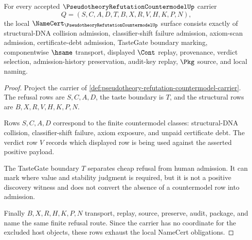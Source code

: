 \begin{theorem}
\label{thm:pseudotheory-refutation-countermodel-namecert-obligations}
For every accepted $\PseudotheoryRefutationCountermodelUp$ carrier
$$
Q=(S,C,A,D,T,B,X,R,V,H,K,P,N),
$$
the local $\NameCert_{\PseudotheoryRefutationCountermodelUp}$ surface consists
exactly of structural-DNA collision admission, classifier-shift failure
admission, axiom-scan admission, certificate-debt admission, TasteGate
boundary marking, componentwise $\hsame$ transport, displayed $\Cont$ replay,
provenance, verdict selection, admission-history preservation, audit-key
replay, $\Pkg$ source, and local naming.
\end{theorem}
\begin{proof}
Project the carrier of
\autoref{def:pseudotheory-refutation-countermodel-carrier}. The refusal rows
are $S,C,A,D$, the taste boundary is $T$, and the structural rows are
$B,X,R,V,H,K,P,N$.

Rows $S,C,A,D$ correspond to the finite countermodel classes: structural-DNA
collision, classifier-shift failure, axiom exposure, and unpaid certificate
debt. The verdict row $V$ records which displayed row is being used against
the asserted positive payload.

The TasteGate boundary $T$ separates cheap refusal from human admission. It can
mark where value and stability judgment is required, but it is not a positive
discovery witness and does not convert the absence of a countermodel row into
admission.

Finally $B,X,R,H,K,P,N$ transport, replay, source, preserve, audit, package,
and name the same finite refusal route. Since the carrier has no coordinate for
the excluded host objects, these rows exhaust the local NameCert obligations.
\end{proof}

